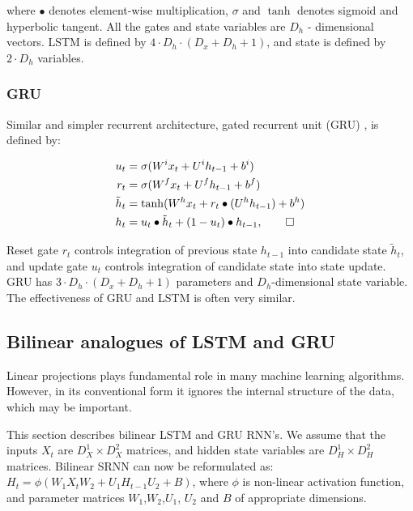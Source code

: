 \documentclass[a4paper,11pt]{article}
\begin{document}
\noindent where $\bullet$ denotes element-wise multiplication,  $\sigma$ and $\tanh$ denotes sigmoid and hyperbolic tangent. All the gates and state variables are $D_{h}$ - dimensional vectors. LSTM is defined by $4 \cdot D_{h} \cdot (D_{x}  + D_{h} + 1)$, and state is defined by $2 \cdot D_{h}$ variables.



\subsubsection{GRU}
Similar and simpler recurrent architecture, gated recurrent unit (GRU) \cite{Chung}, is defined by:

\begin{align}
\begin{split}
\label{LSTM}
u_{t} &=\sigma(W^{i}x_{t} + U^{i}h_{t-1} + b^{i})\\
r_{t} &=\sigma(W^{f}x_{t} + U^{f}h_{t-1} + b^{f})\\
\tilde{h}_{t} &= \tanh(W^{h}x_{t} + r_{t} \bullet (U^{h}h_{t-1}) + b^{h})\\
h_{t} &= u_{t} \bullet \tilde{h}_{t} + (1 - u_{t}) \bullet h_{t-1}, \qedhere
\end{split}
\end{align}

\noindent Reset gate $r_{t}$ controls integration of previous state $h_{t-1}$ into candidate state $\tilde{h}_{t}$, and update gate $u_{t}$ controls integration of candidate state into state update. GRU has $ 3 \cdot D_{h} \cdot (D_{x}  + D_{h} + 1) $ parameters and $D_{h}$-dimensional state variable. The effectiveness of GRU and LSTM is often very similar.




\subsection{Bilinear analogues of LSTM and GRU}

Linear projections plays fundamental role in many machine learning algorithms. However, in its conventional form it ignores the internal structure of the data, which may be important.

This section describes bilinear LSTM and GRU RNN's. We assume that the inputs $X_{t}$ are $D_{X}^{1} \times D_{X}^{2}$ matrices, and hidden state variables are $D_{H}^{1} \times D_{H}^{2}$ matrices. Bilinear SRNN can now be reformulated as:
$H_{t} = \phi(W_{1}X_{t}W_{2} + U_{1}H_{t-1}U_{2} + B)$, where $\phi$ is non-linear activation function, and parameter matrices $W_{1}$,$W_{2}$,$U_{1}$, $U_{2}$ and $B$ of appropriate dimensions.
\end{document}
